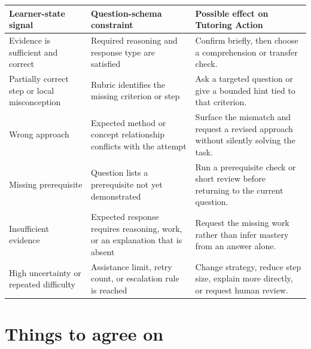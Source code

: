 \documentclass[11pt]{article}
\begin{document}
\noindent\begin{tabularx}{\textwidth}{@{}p{}p{}X@{}}
\toprule
\textbf{Learner-state signal} & \textbf{Question-schema constraint} & \textbf{Possible effect on Tutoring Action} \\
\midrule
Evidence is sufficient and correct & Required reasoning and response type are satisfied & Confirm briefly, then choose a comprehension or transfer check. \\
Partially correct step or local misconception & Rubric identifies the missing criterion or step & Ask a targeted question or give a bounded hint tied to that criterion. \\
Wrong approach & Expected method or concept relationship conflicts with the attempt & Surface the mismatch and request a revised approach without silently solving the task. \\
Missing prerequisite & Question lists a prerequisite not yet demonstrated & Run a prerequisite check or short review before returning to the current question. \\
Insufficient evidence & Expected response requires reasoning, work, or an explanation that is absent & Request the missing work rather than infer mastery from an answer alone. \\
High uncertainty or repeated difficulty & Assistance limit, retry count, or escalation rule is reached & Change strategy, reduce step size, explain more directly, or request human review. \\
\bottomrule
\end{tabularx}

\section{Things to agree on}
\end{document}

